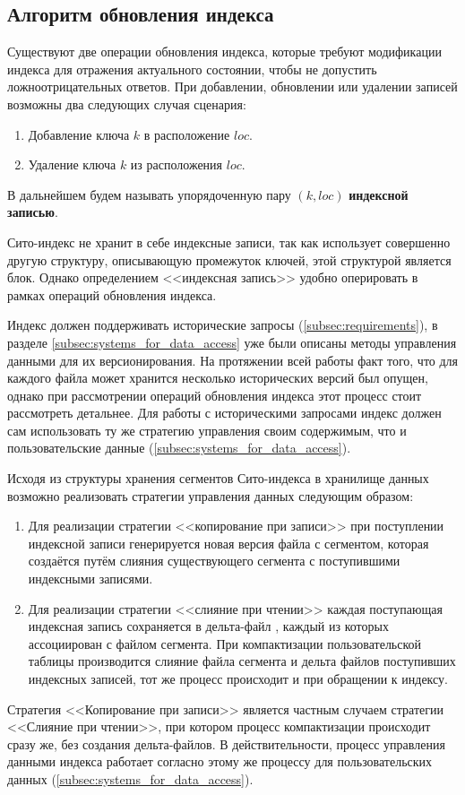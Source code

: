 \subsection{Алгоритм обновления индекса}

Существуют две операции обновления индекса, которые требуют модификации индекса для отражения актуального состоянии, чтобы не допустить ложноотрицательных ответов. При добавлении, обновлении или удалении записей возможны два следующих случая сценария: 
\begin{enumerate}
    \item Добавление ключа $k$ в расположение $loc$.
    \item Удаление ключа $k$ из расположения $loc$.
\end{enumerate}

В дальнейшем будем называть упорядоченную пару $(k, loc)$ \textbf{индексной записью}.

Сито-индекс не хранит в себе индексные записи, так как использует совершенно другую структуру, описывающую промежуток ключей, этой структурой является блок. Однако определением {<<индексная запись>>} удобно оперировать в рамках операций обновления индекса.

Индекс должен поддерживать исторические запросы (\ref{subsec:requirements}), в разделе \ref{subsec:systems_for_data_access} уже были описаны методы управления данными для их версионирования. На протяжении всей работы факт того, что для каждого файла может хранится несколько исторических версий был опущен, однако при рассмотрении операций обновления индекса этот процесс стоит рассмотреть детальнее. Для работы с историческими запросами индекс должен сам использовать ту же стратегию управления своим содержимым, что и пользовательские данные (\ref{subsec:systems_for_data_access}).

Исходя из структуры хранения сегментов Сито-индекса в хранилище данных возможно реализовать стратегии управления данных следующим образом:
\begin{enumerate}
    \item Для реализации стратегии {<<копирование при записи>>} при поступлении индексной записи генерируется новая версия файла с сегментом, которая создаётся путём слияния существующего сегмента с поступившими индексными записями.
    \item Для реализации стратегии {<<слияние при чтении>>} каждая поступающая индексная запись сохраняется в дельта-файл , каждый из которых ассоциирован с файлом сегмента. При компактизации пользовательской таблицы производится слияние файла сегмента и дельта файлов поступивших индексных записей, тот же процесс происходит и при обращении к индексу.
\end{enumerate}
Стратегия {<<Копирование при записи>>} является частным случаем стратегии {<<Слияние при чтении>>}, при котором процесс компактизации происходит сразу же, без создания дельта-файлов. В действительности, процесс управления данными индекса работает согласно этому же процессу для пользовательских данных (\ref{subsec:systems_for_data_access}).

